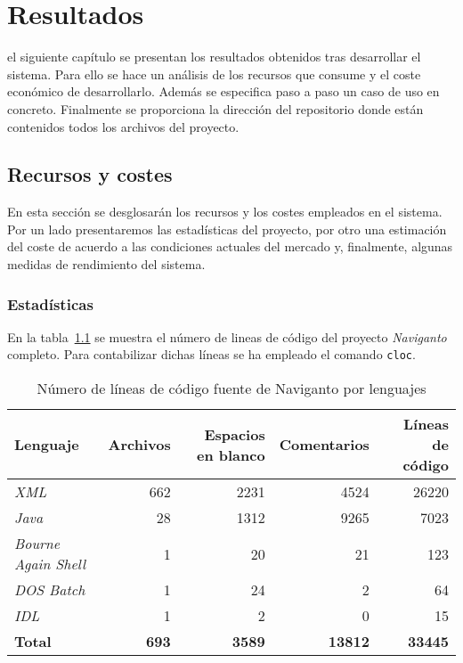 \chapter{Resultados}
\label{chap:resultados}

 el siguiente capítulo se presentan los resultados obtenidos tras desarrollar el
sistema. Para ello se hace un análisis de los recursos que consume y el coste económico
de desarrollarlo. Además se especifica paso a paso un caso de uso en concreto. Finalmente se
proporciona la dirección del repositorio donde están contenidos todos los archivos del proyecto.

\section{Recursos y costes}

En esta sección se desglosarán los recursos y los costes empleados en el sistema. Por un lado
presentaremos las estadísticas del proyecto, por otro una estimación del coste de acuerdo a las
condiciones actuales del mercado y, finalmente, algunas medidas de rendimiento del sistema.

\subsection{Estadísticas}

En la tabla~\ref{cuadro:lineasCodigo} se muestra el número de lineas de código del proyecto
\emph{Naviganto} completo. Para contabilizar dichas líneas se ha empleado el comando \texttt{cloc}.

\begin{table}[h]
  \centering
  \begin{tabular}{|l|r|r|r|r|}
    \hline
    \textbf{Lenguaje} & \textbf{Archivos} & \textbf{Espacios en blanco} & \textbf{Comentarios} & 
      \textbf{Líneas de código} \\
    \hline
    \emph{XML}                &         662  &         2231  &          4524  &         26220  \\
    \hline
    \emph{Java}               &          28  &         1312  &          9265  &          7023  \\
    \hline
    \emph{Bourne Again Shell} &           1  &           20  &            21  &           123  \\
    \hline
    \emph{DOS Batch}          &           1  &           24  &             2  &            64  \\
    \hline
    \emph{IDL}                &           1  &            2  &             0  &            15  \\
    \hline
    \textbf{Total}            & \textbf{693} & \textbf{3589} & \textbf{13812} & \textbf{33445} \\
    \hline
  \end{tabular}
  \caption{Número de líneas de código fuente de Naviganto por lenguajes}
  \label{cuadro:lineasCodigo}
\end{table} 

